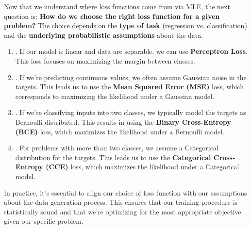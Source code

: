 \begin{deepeningbox}
    Now that we understand where loss functions come from via MLE, the next question is: \textbf{How do we choose the right loss function for a given problem?} The choice depends on the \textbf{type of task} (regression vs. classification) and the \textbf{underlying probabilistic assumptions} about the data.

    \highspace
    \begin{enumerate}
        \item {}. If our model is linear and data are separable, we can use \textbf{Perceptron Loss}. This loss focuses on maximizing the margin between classes.

        \item {}. If we're predicting continuous values, we often assume Gaussian noise in the targets. This leads us to use the \textbf{Mean Squared Error (MSE)} loss, which corresponds to maximizing the likelihood under a Gaussian model.

        \item {}. If we're classifying inputs into two classes, we typically model the targets as Bernoulli-distributed. This results in using the \textbf{Binary Cross-Entropy (BCE)} loss, which maximizes the likelihood under a Bernoulli model.

        \item {}. For problems with more than two classes, we assume a Categorical distribution for the targets. This leads us to use the \textbf{Categorical Cross-Entropy (CCE)} loss, which maximizes the likelihood under a Categorical model.
    \end{enumerate}

    \highspace
    In practice, it's essential to align our choice of loss function with our assumptions about the data generation process. This ensures that our training procedure is statistically sound and that we're optimizing for the most appropriate objective given our specific problem.
\end{deepeningbox}